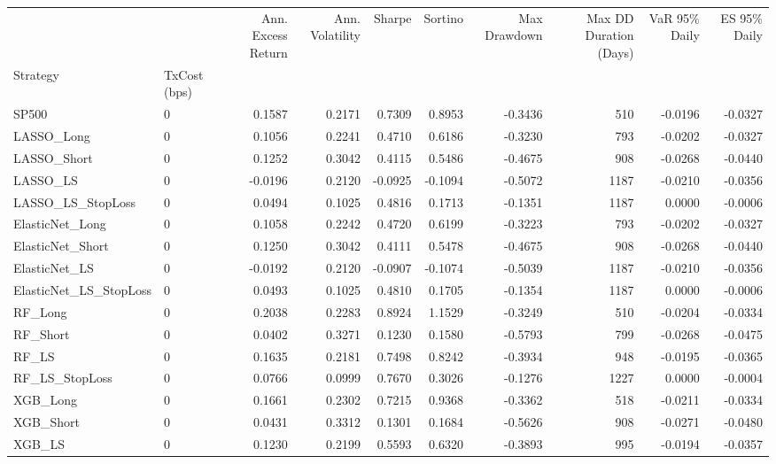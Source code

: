 \begin{tabular}{llrrrrrrrr}
\toprule
 &  & Ann. Excess Return & Ann. Volatility & Sharpe & Sortino & Max Drawdown & Max DD Duration (Days) & VaR 95\% Daily & ES 95\% Daily \\
Strategy & TxCost (bps) &  &  &  &  &  &  &  &  \\
\midrule
SP500 & 0 & 0.1587 & 0.2171 & 0.7309 & 0.8953 & -0.3436 & 510 & -0.0196 & -0.0327 \\
\cline{1-10}
LASSO\_Long & 0 & 0.1056 & 0.2241 & 0.4710 & 0.6186 & -0.3230 & 793 & -0.0202 & -0.0327 \\
\cline{1-10}
LASSO\_Short & 0 & 0.1252 & 0.3042 & 0.4115 & 0.5486 & -0.4675 & 908 & -0.0268 & -0.0440 \\
\cline{1-10}
LASSO\_LS & 0 & -0.0196 & 0.2120 & -0.0925 & -0.1094 & -0.5072 & 1187 & -0.0210 & -0.0356 \\
\cline{1-10}
LASSO\_LS\_StopLoss & 0 & 0.0494 & 0.1025 & 0.4816 & 0.1713 & -0.1351 & 1187 & 0.0000 & -0.0006 \\
\cline{1-10}
ElasticNet\_Long & 0 & 0.1058 & 0.2242 & 0.4720 & 0.6199 & -0.3223 & 793 & -0.0202 & -0.0327 \\
\cline{1-10}
ElasticNet\_Short & 0 & 0.1250 & 0.3042 & 0.4111 & 0.5478 & -0.4675 & 908 & -0.0268 & -0.0440 \\
\cline{1-10}
ElasticNet\_LS & 0 & -0.0192 & 0.2120 & -0.0907 & -0.1074 & -0.5039 & 1187 & -0.0210 & -0.0356 \\
\cline{1-10}
ElasticNet\_LS\_StopLoss & 0 & 0.0493 & 0.1025 & 0.4810 & 0.1705 & -0.1354 & 1187 & 0.0000 & -0.0006 \\
\cline{1-10}
RF\_Long & 0 & 0.2038 & 0.2283 & 0.8924 & 1.1529 & -0.3249 & 510 & -0.0204 & -0.0334 \\
\cline{1-10}
RF\_Short & 0 & 0.0402 & 0.3271 & 0.1230 & 0.1580 & -0.5793 & 799 & -0.0268 & -0.0475 \\
\cline{1-10}
RF\_LS & 0 & 0.1635 & 0.2181 & 0.7498 & 0.8242 & -0.3934 & 948 & -0.0195 & -0.0365 \\
\cline{1-10}
RF\_LS\_StopLoss & 0 & 0.0766 & 0.0999 & 0.7670 & 0.3026 & -0.1276 & 1227 & 0.0000 & -0.0004 \\
\cline{1-10}
XGB\_Long & 0 & 0.1661 & 0.2302 & 0.7215 & 0.9368 & -0.3362 & 518 & -0.0211 & -0.0334 \\
\cline{1-10}
XGB\_Short & 0 & 0.0431 & 0.3312 & 0.1301 & 0.1684 & -0.5626 & 908 & -0.0271 & -0.0480 \\
\cline{1-10}
XGB\_LS & 0 & 0.1230 & 0.2199 & 0.5593 & 0.6320 & -0.3893 & 995 & -0.0194 & -0.0357 \\

\end{tabular}
